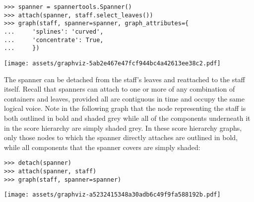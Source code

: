 \begin{comment}
<abjad>
spanner = spannertools.Spanner()
attach(spanner, staff.select_leaves())
graph(staff, spanner=spanner, graph_attributes={
    'splines': 'curved',
    'concentrate': True,
    })
</abjad>
\end{comment}

\begin{abjadbookoutput}
\begin{singlespacing}
\vspace{-0.5\baselineskip}
\begin{lstlisting}
>>> spanner = spannertools.Spanner()
>>> attach(spanner, staff.select_leaves())
>>> graph(staff, spanner=spanner, graph_attributes={
...     'splines': 'curved',
...     'concentrate': True,
...     })
\end{lstlisting}
\noindent\texttt{[image: assets/graphviz-5ab2e467e47fcf944bc4a42613ee38c2.pdf]}
\end{singlespacing}
\end{abjadbookoutput}

\noindent The spanner can be detached from the staff's leaves and reattached to
the staff itself. Recall that spanners can attach to one or more of any
combination of containers and leaves, provided all are contiguous in time and
occupy the same logical voice. Note in the following graph that the node
representing the staff is both outlined in bold and shaded grey while all of
the components underneath it in the score hierarchy are simply shaded grey. In
these score hierarchy graphs, only those nodes to which the spanner directly
attaches are outlined in bold, while all components that the spanner
covers are simply shaded:

\begin{comment}
<abjad>
detach(spanner)
attach(spanner, staff)
graph(staff, spanner=spanner)
</abjad>
\end{comment}

\begin{abjadbookoutput}
\begin{singlespacing}
\vspace{-0.5\baselineskip}
\begin{lstlisting}
>>> detach(spanner)
>>> attach(spanner, staff)
>>> graph(staff, spanner=spanner)
\end{lstlisting}
\noindent\texttt{[image: assets/graphviz-a5232415348a30adb6c49f9fa588192b.pdf]}
\end{singlespacing}
\end{abjadbookoutput}


